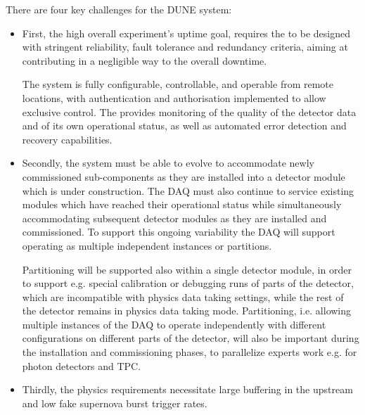 




There are four key challenges for the DUNE   system: 
\begin{itemize}
\item First, the high overall experiment's uptime goal, requires the  to be designed with stringent reliability, fault tolerance and redundancy criteria, aiming at contributing in a negligible way to the overall downtime.

  The  system is fully configurable, controllable, and operable from remote locations, with authentication and authorisation implemented to allow exclusive control. The  provides monitoring of the quality of the detector data and of its own operational status, as well as automated error detection and recovery capabilities.

\item Secondly, the system must be able to evolve to accommodate newly commissioned sub-components as they are installed into a detector module which is under construction. 
  The DAQ must also continue to service existing modules which have reached their operational status while simultaneously accommodating subsequent detector modules as they are installed and commissioned. 
  To support this ongoing variability the DAQ will support operating as multiple independent instances or partitions.

  Partitioning will be supported also within a single detector module, in order to support e.g. special calibration or debugging runs of parts of the detector, which are incompatible with physics data taking settings, while the rest of the detector remains in physics data taking mode. Partitioning, i.e. allowing multiple instances of the DAQ to operate independently with different configurations on different parts of the detector, will also be important during the installation and commissioning phases, to parallelize experts work e.g. for photon detectors and TPC.

\item Thirdly, the   physics
requirements necessitate large buffering in the upstream  and low fake
supernova burst trigger rates. 


\end{itemize}
